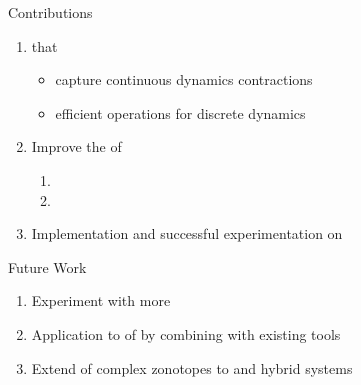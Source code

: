 \begin{frame}{Contributions}
\begin{enumerate}
\item {} that
\begin{itemize}
\item capture continuous dynamics contractions 
\item efficient operations for discrete dynamics
\end{itemize}


\item Improve the  of 
%
%
\begin{enumerate}
\item {}
\item {}
 \end{enumerate}
\item Implementation and successful experimentation on 
\end{enumerate}
\end{frame}


\begin{frame}{Future Work}
\begin{enumerate}
\item Experiment with more 
\item Application to  of  by combining with existing tools
\item Extend  of complex zonotopes to  and  hybrid systems
\end{enumerate}
\end{frame}

